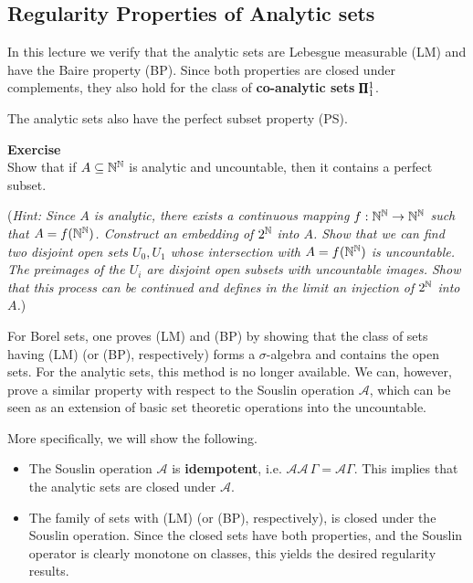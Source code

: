 \subsection{Regularity Properties of Analytic sets}

In this lecture we verify that the analytic sets are Lebesgue measurable (LM) and have the Baire property (BP). Since both properties are closed under complements, they also hold for the class of \textbf{co-analytic sets} $\pmb{\Pi}^1_{1}$.

The analytic sets also have the perfect subset property (PS).

\begin{framed}
\textbf{Exercise}\\
Show that if $A \subseteq \mathbb{N}^{\mathbb{N}}$ is analytic and uncountable, then it contains a perfect subset.

(\textit{Hint: Since $A$ is analytic, there exists a continuous mapping $f:\mathbb{N}^{\mathbb{N}} \to \mathbb{N}^{\mathbb{N}}$ such that $A = f(\mathbb{N}^{\mathbb{N}})$. Construct an embedding of $2^{\mathbb{N}}$ into $A$. Show that we can find two disjoint open sets $U_0, U_1$ whose intersection with  $A = f(\mathbb{N}^{\mathbb{N}})$ is uncountable. The preimages of the $U_i$ are disjoint open subsets with uncountable images. Show that this process can be continued and defines in the limit an injection of $2^{\mathbb{N}}$ into $A$.})
\end{framed}

For Borel sets, one proves (LM) and (BP) by showing that the class of sets having  (LM) (or (BP), respectively)  forms a $\sigma$-algebra and contains the open sets. For the analytic sets, this method is no longer available. We can, however, prove a similar property with respect to the Souslin operation $\mathcal{A}$, which can be seen as an extension of basic set theoretic operations into the uncountable.

More specifically, we will show the following.

\begin{itemize}
\item The Souslin operation $\mathcal{A}$ is \textbf{idempotent}, i.e. $\mathcal{A}\mathcal{A} \, \Gamma = \mathcal{A}\Gamma$. This implies that the analytic sets are closed under $\mathcal{A}$.


\item The family of sets with (LM) (or (BP), respectively), is closed under the Souslin operation. Since the closed sets have both properties, and the Souslin operator is clearly monotone on classes, this yields the desired regularity results.
\end{itemize}

